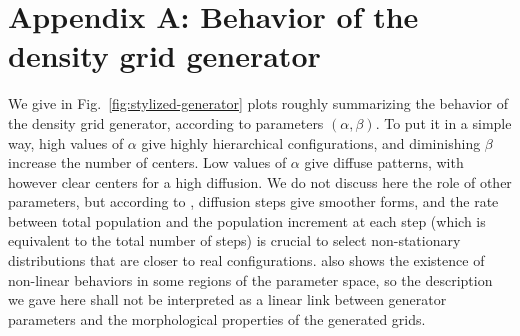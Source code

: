 \documentclass{JASSS}
\begin{document}






\endparano






\section{Appendix A: Behavior of the density grid generator}

We give in Fig.~\ref{fig:stylized-generator} plots roughly summarizing the behavior of the density grid generator, according to parameters $(\alpha,\beta)$. To put it in a simple way, high values of $\alpha$ give highly hierarchical configurations, and diminishing $\beta$ increase the number of centers. Low values of $\alpha$ give diffuse patterns, with however clear centers for a high diffusion. We do not discuss here the role of other parameters, but according to \cite{raimbault2018calibration}, diffusion steps give smoother forms, and the rate between total population and the population increment at each step (which is equivalent to the total number of steps) is crucial to select non-stationary distributions that are closer to real configurations. \cite{raimbault2018calibration} also shows the existence of non-linear behaviors in some regions of the parameter space, so the description we gave here shall not be interpreted as a linear link between generator parameters and the morphological properties of the generated grids.
\end{document}
